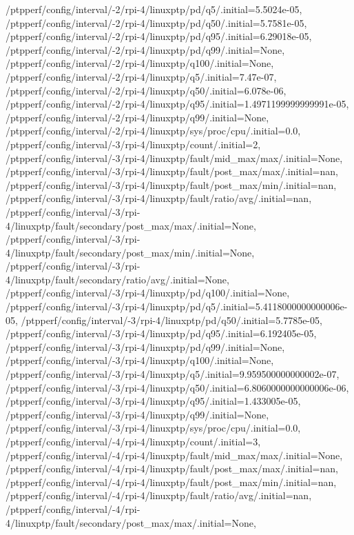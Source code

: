 {    /ptpperf/config/interval/-2/rpi-4/linuxptp/pd/q5/.initial=5.5024e-05,
    /ptpperf/config/interval/-2/rpi-4/linuxptp/pd/q50/.initial=5.7581e-05,
    /ptpperf/config/interval/-2/rpi-4/linuxptp/pd/q95/.initial=6.29018e-05,
    /ptpperf/config/interval/-2/rpi-4/linuxptp/pd/q99/.initial=None,
    /ptpperf/config/interval/-2/rpi-4/linuxptp/q100/.initial=None,
    /ptpperf/config/interval/-2/rpi-4/linuxptp/q5/.initial=7.47e-07,
    /ptpperf/config/interval/-2/rpi-4/linuxptp/q50/.initial=6.078e-06,
    /ptpperf/config/interval/-2/rpi-4/linuxptp/q95/.initial=1.4971199999999991e-05,
    /ptpperf/config/interval/-2/rpi-4/linuxptp/q99/.initial=None,
    /ptpperf/config/interval/-2/rpi-4/linuxptp/sys/proc/cpu/.initial=0.0,
    /ptpperf/config/interval/-3/rpi-4/linuxptp/count/.initial=2,
    /ptpperf/config/interval/-3/rpi-4/linuxptp/fault/mid_max/max/.initial=None,
    /ptpperf/config/interval/-3/rpi-4/linuxptp/fault/post_max/max/.initial=nan,
    /ptpperf/config/interval/-3/rpi-4/linuxptp/fault/post_max/min/.initial=nan,
    /ptpperf/config/interval/-3/rpi-4/linuxptp/fault/ratio/avg/.initial=nan,
    /ptpperf/config/interval/-3/rpi-4/linuxptp/fault/secondary/post_max/max/.initial=None,
    /ptpperf/config/interval/-3/rpi-4/linuxptp/fault/secondary/post_max/min/.initial=None,
    /ptpperf/config/interval/-3/rpi-4/linuxptp/fault/secondary/ratio/avg/.initial=None,
    /ptpperf/config/interval/-3/rpi-4/linuxptp/pd/q100/.initial=None,
    /ptpperf/config/interval/-3/rpi-4/linuxptp/pd/q5/.initial=5.4118000000000006e-05,
    /ptpperf/config/interval/-3/rpi-4/linuxptp/pd/q50/.initial=5.7785e-05,
    /ptpperf/config/interval/-3/rpi-4/linuxptp/pd/q95/.initial=6.192405e-05,
    /ptpperf/config/interval/-3/rpi-4/linuxptp/pd/q99/.initial=None,
    /ptpperf/config/interval/-3/rpi-4/linuxptp/q100/.initial=None,
    /ptpperf/config/interval/-3/rpi-4/linuxptp/q5/.initial=9.959500000000002e-07,
    /ptpperf/config/interval/-3/rpi-4/linuxptp/q50/.initial=6.8060000000000006e-06,
    /ptpperf/config/interval/-3/rpi-4/linuxptp/q95/.initial=1.433005e-05,
    /ptpperf/config/interval/-3/rpi-4/linuxptp/q99/.initial=None,
    /ptpperf/config/interval/-3/rpi-4/linuxptp/sys/proc/cpu/.initial=0.0,
    /ptpperf/config/interval/-4/rpi-4/linuxptp/count/.initial=3,
    /ptpperf/config/interval/-4/rpi-4/linuxptp/fault/mid_max/max/.initial=None,
    /ptpperf/config/interval/-4/rpi-4/linuxptp/fault/post_max/max/.initial=nan,
    /ptpperf/config/interval/-4/rpi-4/linuxptp/fault/post_max/min/.initial=nan,
    /ptpperf/config/interval/-4/rpi-4/linuxptp/fault/ratio/avg/.initial=nan,
    /ptpperf/config/interval/-4/rpi-4/linuxptp/fault/secondary/post_max/max/.initial=None,
}
